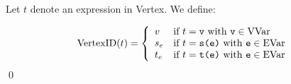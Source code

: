 \documentclass{llncs}
\newcommand{\mt}[1]{\text{\tt{#1}}}
\begin{document}
	
	\begin{definition}\label{def:VertexID}\rm
		Let $t$ denote an expression in Vertex. We define:

			\[\text{VertexID}(t) = \left\{
				     \begin{array}{ll}
				       v & \text{if $t = \mathtt{v}$ with $\mathtt{v}\in\text{VVar}$}\\
				       s_e & \text{if $t = \mathtt{s}\mt{(}\mathtt{e}\mt{)}$ with $\mathtt{e}\in\text{EVar}$}\\
				       t_e & \text{if $t = \mathtt{t}\mt{(}\mathtt{e}\mt{)}$ with $\mathtt{e}\in\text{EVar}$}\\
				     \end{array}
				   \right.\]
		\qed
	\end{definition}
	
\end{document}
